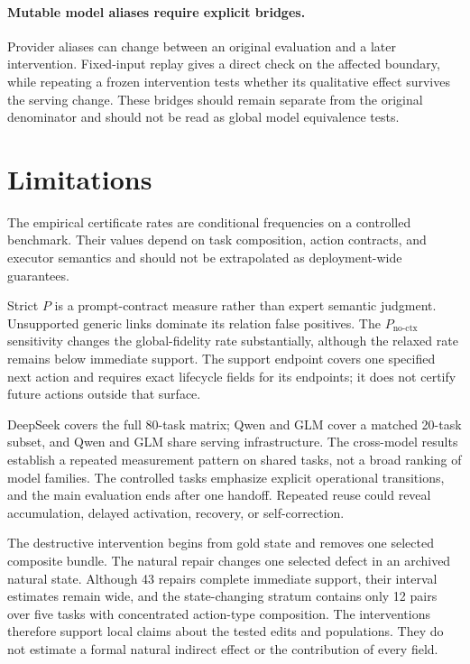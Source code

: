 \documentclass[11pt]{article}
\newcommand{\Pstrict}{P}
\newcommand{\Pnoctx}{P_{\mathrm{no\mbox{-}ctx}}}
\begin{document}
\paragraph{Mutable model aliases require explicit bridges.}
Provider aliases can change between an original evaluation and a later intervention. Fixed-input replay gives a direct check on the affected boundary, while repeating a frozen intervention tests whether its qualitative effect survives the serving change. These bridges should remain separate from the original denominator and should not be read as global model equivalence tests.

\section{Limitations}
\label{sec:limitations}

The empirical certificate rates are conditional frequencies on a controlled benchmark. Their values depend on task composition, action contracts, and executor semantics and should not be extrapolated as deployment-wide guarantees.

Strict \(\Pstrict\) is a prompt-contract measure rather than expert semantic judgment. Unsupported generic links dominate its relation false positives. The \(\Pnoctx\) sensitivity changes the global-fidelity rate substantially, although the relaxed rate remains below immediate support. The support endpoint covers one specified next action and requires exact lifecycle fields for its endpoints; it does not certify future actions outside that surface.

DeepSeek covers the full 80-task matrix; Qwen and GLM cover a matched 20-task subset, and Qwen and GLM share serving infrastructure. The cross-model results establish a repeated measurement pattern on shared tasks, not a broad ranking of model families. The controlled tasks emphasize explicit operational transitions, and the main evaluation ends after one handoff. Repeated reuse could reveal accumulation, delayed activation, recovery, or self-correction.

The destructive intervention begins from gold state and removes one selected composite bundle. The natural repair changes one selected defect in an archived natural state. Although 43 repairs complete immediate support, their interval estimates remain wide, and the state-changing stratum contains only 12 pairs over five tasks with concentrated action-type composition. The interventions therefore support local claims about the tested edits and populations. They do not estimate a formal natural indirect effect or the contribution of every field.
\end{document}
